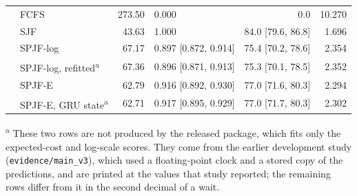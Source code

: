 \documentclass[mathematics,supfile,submit,moreauthors]{Definitions/mdpi}
\newcommand{\devnum}[1]{#1}
\begin{document}
\begin{table}[htbp]
\begin{tabular}{llrlrr}
 & FCFS                 & \devnum{273.50} & \devnum{0.000} & \devnum{0.0} & \devnum{10.270} \\
 & SJF                  &\devnum{43.63} & \devnum{1.000} & \devnum{84.0 [79.6, 86.8]} & \devnum{1.696} \\
 & SPJF-log             &\devnum{67.17} & \devnum{0.897 [0.872, 0.914]} & \devnum{75.4 [70.2, 78.6]} & \devnum{2.354} \\
 & SPJF-log, refitted\textsuperscript{a}   &\devnum{67.36} & \devnum{0.896 [0.871, 0.913]} & \devnum{75.3 [70.1, 78.5]} & \devnum{2.352} \\
 & SPJF-E               &\devnum{62.79} & \devnum{0.916 [0.892, 0.930]} & \devnum{77.0 [71.6, 80.3]} & \devnum{2.294} \\
 & SPJF-E, GRU state\textsuperscript{a}    &\devnum{62.71} & \devnum{0.917 [0.895, 0.929]} & \devnum{77.0 [71.7, 80.3]} & \devnum{2.302} \\
\bottomrule
\end{tabular}

\vspace{2pt}
\begin{minipage}{\textwidth}
\footnotesize
\textsuperscript{a} These two rows are not produced by the released package, which fits only
the expected-cost and log-scale scores. They come from the earlier development study
(\texttt{evidence/main\_v3}), which used a floating-point clock and a stored copy of the
predictions, and are printed at the values that study reported; the remaining rows differ from
it in the second decimal of a wait.
\end{minipage}
\end{table}
\end{document}
